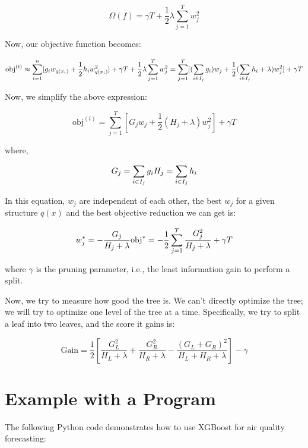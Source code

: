 \[
\Omega(f) = \gamma T + \frac{1}{2}\lambda \sum_{j=1}^T w_j^2
\]

Now, our objective function becomes:

\[
\text{obj}^{(t)} \approx \sum_{i=1}^n [g_i w_{q(x_i)} + \frac{1}{2} h_i w_{q(x_i)}^2] + \gamma T + \frac{1}{2}\lambda \sum_{j=1}^T w_j^2 \\
= \sum^T_{j=1} [(\sum_{i\in I_j} g_i) w_j + \frac{1}{2} (\sum_{i\in I_j} h_i + \lambda) w_j^2 ] + \gamma T
\]

Now, we simplify the above expression:

\[
\text{obj}^{(t)} = \sum^T_{j=1} [G_jw_j + \frac{1}{2} (H_j+\lambda) w_j^2] +\gamma T
\]

where,

\[
G_j = \sum_{i\in I_j} g_i \\
H_j = \sum_{i\in I_j} h_i
\]

In this equation, \(w_j\) are independent of each other, the best \(w_j\) for a given structure \(q(x)\) and the best objective reduction we can get is:

\[
w_j^{\ast} = -\frac{G_j}{H_j+\lambda} \\
\text{obj}^{\ast} = -\frac{1}{2} \sum_{j=1}^T \frac{G_j^2}{H_j+\lambda} + \gamma T
\]

where \(\gamma\) is the pruning parameter, i.e., the least information gain to perform a split.

Now, we try to measure how good the tree is. We can’t directly optimize the tree; we will try to optimize one level of the tree at a time. Specifically, we try to split a  leaf into two leaves, and the score it gains is:

\[
\text{Gain} = \frac{1}{2} \left[\frac{G_L^2}{H_L+\lambda}+\frac{G_R^2}{H_R+\lambda}-\frac{(G_L+G_R)^2}{H_L+H_R+\lambda}\right] - \gamma
\]

\section{Example with a Program}

The following Python code demonstrates how to use XGBoost for air quality forecasting:

